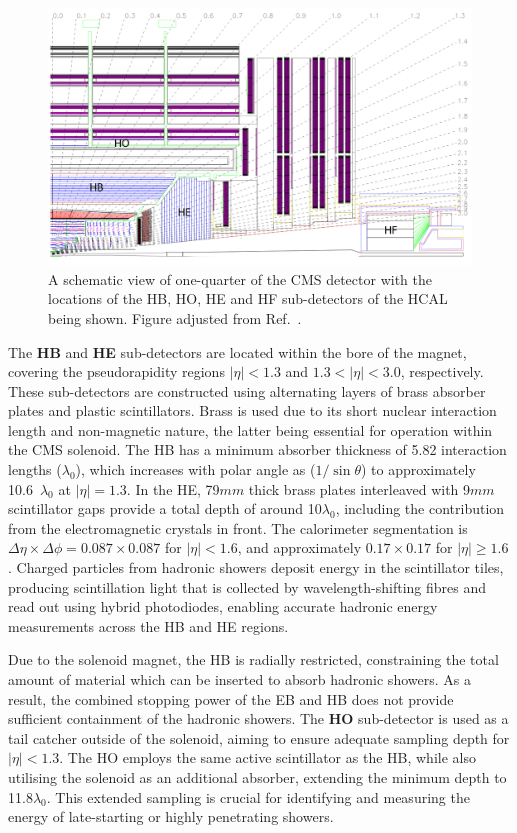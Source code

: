 \begin{figure}[h]
\centering
\includegraphics[width= 1.0\textwidth]{Figures/Chapter3/CMS_HCAL.pdf}
\caption{A schematic view of one-quarter of the CMS detector with the locations of the HB, HO, HE and HF sub-detectors of the HCAL being shown. Figure adjusted from Ref.~\cite{LHC_CMS}.}
\label{Figure:Chapter3_CMS_HCAL}
\end{figure}

The \textbf{HB} and \textbf{HE} sub-detectors are located within the bore of the magnet, covering the pseudorapidity regions $|\eta| < 1.3$ and $1.3 < |\eta| < 3.0$, respectively. These sub-detectors are constructed using alternating layers of brass absorber plates and plastic scintillators. Brass is used due to its short nuclear interaction length and non-magnetic nature, the latter being essential for operation within the CMS solenoid. The HB has a minimum absorber thickness of 5.82 interaction lengths ($\lambda_0$), which increases with polar angle as ($1/\sin\theta$) to approximately 10.6~$\lambda_0$ at $|\eta| = 1.3$. In the HE, 79$\unit{mm}$ thick brass plates interleaved with 9$\unit{mm}$ scintillator gaps provide a total depth of around 10$\lambda_0$, including the contribution from the electromagnetic crystals in front. The calorimeter segmentation is $\Delta\eta \times \Delta\phi = 0.087 \times 0.087$ for $|\eta| < 1.6$, and approximately $0.17 \times 0.17$ for $|\eta| \geq 1.6$. Charged particles from hadronic showers deposit energy in the scintillator tiles, producing scintillation light that is collected by wavelength-shifting fibres and read out using hybrid photodiodes, enabling accurate hadronic energy measurements across the HB and HE regions.

Due to the solenoid magnet, the HB is radially restricted, constraining the total amount of material which can be inserted to absorb hadronic showers. As a result, the combined stopping power of the EB and HB does not provide sufficient containment of the hadronic showers. The \textbf{HO} sub-detector is used as a tail catcher outside of the solenoid, aiming to ensure adequate sampling depth for $|\eta| < 1.3$. The HO employs the same active scintillator as the HB, while also utilising the solenoid as an additional absorber, extending the minimum depth to 11.8$\lambda_0$. This extended sampling is crucial for identifying and measuring the energy of late-starting or highly penetrating showers.

